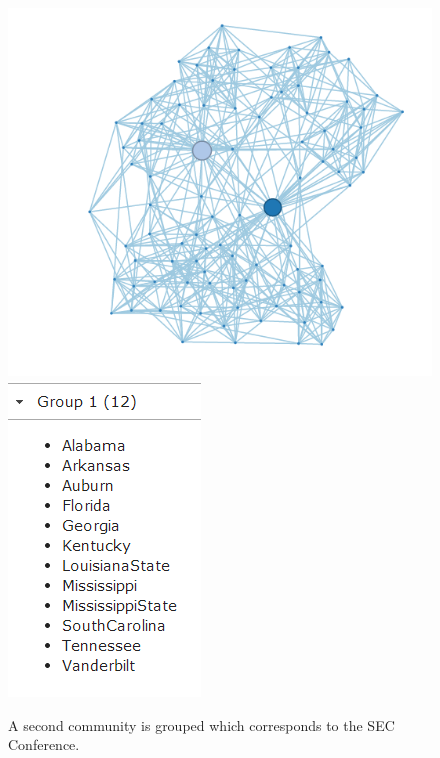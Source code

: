 \documentclass{article}\usepackage[]{graphicx}\usepackage[]{color}
\begin{document}
\begin{figure}[hbtp]
\centering
\includegraphics[width=\textwidth]{images/football_6.png}
\includegraphics[width=\textwidth]{images/football_7.png}
\caption{\label{fig:football_6} A second community is grouped which corresponds to the SEC Conference.}
\end{figure}
\end{document}
